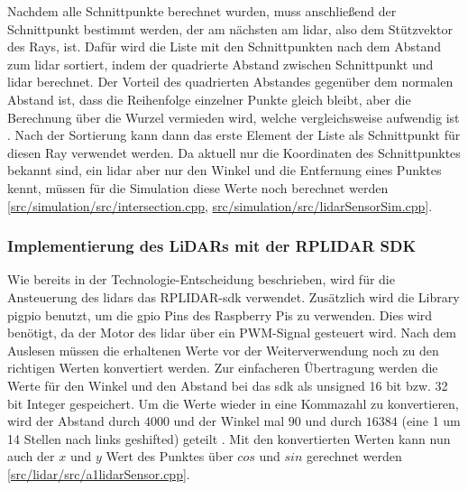 Nachdem alle Schnittpunkte berechnet wurden, muss anschließend der Schnittpunkt bestimmt werden, der am nächsten am \ac{lidar}, 
also dem Stützvektor des Rays, ist. 
Dafür wird die Liste mit den Schnittpunkten nach dem Abstand zum \ac{lidar} sortiert, 
indem der quadrierte Abstand zwischen Schnittpunkt und \ac{lidar} berechnet. 
Der Vorteil des quadrierten Abstandes gegenüber dem normalen Abstand ist, dass die Reihenfolge einzelner Punkte gleich bleibt, 
aber die Berechnung über die Wurzel vermieden wird, welche vergleichsweise aufwendig ist \cite{stackexchangeAreThereAny2012}. 
Nach der Sortierung kann dann das erste Element der Liste als Schnittpunkt für diesen Ray verwendet werden. 
Da aktuell nur die Koordinaten des Schnittpunktes bekannt sind, ein \ac{lidar} aber nur den Winkel und die Entfernung eines Punktes kennt, 
müssen für die Simulation diese Werte noch berechnet werden 
[\href{https://github.com/Jundy0/Studienarbeit/blob/main/src/simulation/src/intersection.cpp}{src/simulation/src/intersection.cpp}, 
\href{https://github.com/Jundy0/Studienarbeit/blob/main/src/simulation/src/lidarSensorSim.cpp}{src/simulation/src/lidarSensorSim.cpp}]. 

\subsubsection{Implementierung des LiDARs mit der RPLIDAR SDK} \label{lidar_implementation}

Wie bereits in der Technologie-Entscheidung beschrieben, wird für die Ansteuerung des \ac{lidar}s das RPLIDAR-\ac{sdk} verwendet. 
Zusätzlich wird die Library pigpio benutzt, um die \ac{gpio} Pins des Raspberry Pis zu verwenden. Dies wird benötigt, 
da der Motor des \ac{lidar} über ein PWM-Signal gesteuert wird. 
Nach dem Auslesen müssen die erhaltenen Werte vor der Weiterverwendung noch zu den richtigen Werten konvertiert werden. 
Zur einfacheren Übertragung werden die Werte für den Winkel und den Abstand bei das \ac{sdk} als unsigned 16 bit bzw. 32 bit Integer gespeichert. 
Um die Werte wieder in eine Kommazahl zu konvertieren, 
wird der Abstand durch \(4000\) und der Winkel mal \(90\) und durch \(16384\) (eine 1 um 14 Stellen nach links geshifted) geteilt 
\cite{RplidarSDK2023}. 
Mit den konvertierten Werten kann nun auch der \(x\) und \(y\) Wert des Punktes über \(cos\) und \(sin\) gerechnet werden 
[\href{https://github.com/Jundy0/Studienarbeit/blob/main/src/lidar/src/a1lidarSensor.cpp}{src/lidar/src/a1lidarSensor.cpp}]. 

